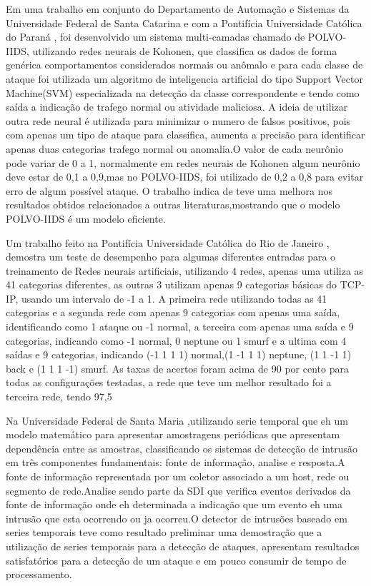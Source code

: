 \documentclass[
	12pt,				%
	openright,			%
	oneside,
	a4paper,			%
	english,			%
	french,				%
	spanish,			%
	brazil				%
	]{abntex2}
\begin{document}
Em uma trabalho em conjunto do Departamento de Automação e Sistemas da Universidade Federal de Santa Catarina \cite{polvo1} e com a Pontifícia Universidade Católica do Paraná \cite{polvo2}, foi desenvolvido um sistema multi-camadas chamado de POLVO-IIDS, utilizando redes neurais de Kohonen, que classifica os dados de forma genérica comportamentos considerados normais ou anômalo e para cada classe de ataque foi utilizada um algoritmo de inteligencia artificial do tipo Support Vector Machine(SVM) especializada na detecção da classe correspondente e tendo como saída a indicação de trafego normal ou atividade maliciosa.
A ideia de utilizar outra rede neural é utilizada para minimizar o numero de falsos positivos, pois com apenas um tipo de ataque para classifica, aumenta a precisão para identificar apenas duas categorias trafego normal ou anomalia.O valor de cada neurônio pode variar de 0 a 1, normalmente em redes neurais de Kohonen algum neurônio deve estar de 0,1 a 0,9,mas no POLVO-IIDS, foi utilizado de 0,2 a 0,8 para evitar erro de algum possível ataque. O trabalho indica de teve uma melhora nos resultados obtidos relacionados a outras literaturas,mostrando que o modelo POLVO-IIDS é um modelo eficiente.

Um trabalho feito na Pontifícia Universidade Católica do Rio de Janeiro \cite{RenatoMaia}, demostra um teste de desempenho para algumas diferentes entradas para o treinamento de Redes neurais artificiais,
utilizando 4 redes, apenas uma utiliza as 41 categorias diferentes, as outras 3 utilizam apenas 9 categorias básicas do TCP-IP, usando um intervalo de -1 a 1. A primeira rede utilizando todas as 41 categorias e a segunda rede com apenas 9 categorias com apenas uma saída, identificando como 1 ataque ou -1 normal, a terceira com apenas uma saída e 9 categorias, indicando como -1 normal, 0 neptune ou 1 smurf e a ultima com 4 saídas e 9 categorias, indicando (-1 1 1 1) normal,(1 -1 1 1) neptune, (1 1 -1 1) back e (1 1 1 -1) smurf. As taxas de acertos foram acima de 90 por cento para todas as configurações testadas, a rede que teve um melhor resultado foi a terceira rede, tendo 97,5%

Na Universidade Federal de Santa Maria \cite{Dalmazo},utilizando serie temporal que eh um modelo matemático para apresentar amostragens periódicas que apresentam dependência entre as amostras, classificando os sistemas de detecção de intrusão em três componentes fundamentais: fonte de informação, analise e resposta.A fonte de informação representada por um coletor associado a um host, rede ou segmento de rede.Analise sendo parte da SDI que verifica eventos derivados da fonte de informação onde eh determinada a indicação que um evento eh uma intrusão que esta ocorrendo ou ja ocorreu.O detector de intrusões baseado em series temporais teve como resultado preliminar uma demostração que a utilização de series temporais para a detecção de ataques, apresentam resultados satisfatórios para a detecção de um ataque e em pouco consumir de tempo de processamento.
\end{document}
